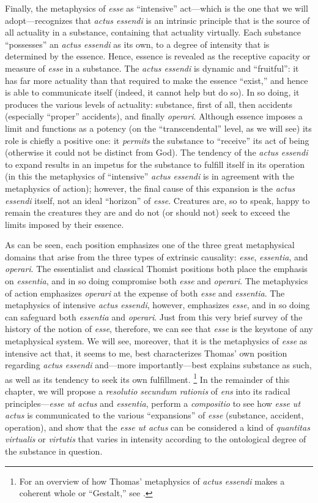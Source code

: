 Finally, the metaphysics of \emph{esse} as “intensive” act—which is the one that we will adopt—recognizes that \emph{actus essendi} is an intrinsic principle that is the source of all actuality in a substance, containing that actuality virtually. Each substance “possesses” an \emph{actus essendi} as its own, to a degree of intensity that is determined by the essence. Hence, essence is revealed as the receptive capacity or measure of \emph{esse} in a substance. The \emph{actus essendi} is dynamic and “fruitful”: it has far more actuality than that required to make the essence “exist,” and hence is able to communicate itself (indeed, it cannot help but do so). In so doing, it produces the various levels of actuality: substance, first of all, then accidents (especially “proper” accidents), and finally \emph{operari}. Although essence imposes a limit and functions as a potency (on the “transcendental” level, as we will see) its role is chiefly a positive one: it \emph{permits} the substance to “receive” its act of being (otherwise it could not be distinct from God). The tendency of the \emph{actus essendi} to expand results in an impetus for the substance to fulfill itself in its operation (in this the metaphysics of “intensive” \emph{actus essendi} is in agreement with the metaphysics of action); however, the final cause of this expansion is the \emph{actus essendi} itself, not an ideal “horizon” of \emph{esse}. Creatures are, so to speak, happy to remain the creatures they are and do not (or should not) seek to exceed the limits imposed by their essence.

As can be seen, each position emphasizes one of the three great metaphysical domains that arise from the three types of extrinsic causality: \emph{esse}, \emph{essentia}, and \emph{operari}. The essentialist and classical Thomist positions both place the emphasis on \emph{essentia}, and in so doing compromise both \emph{esse} and \emph{operari}. The metaphysics of action emphasizes \emph{operari} at the expense of both \emph{esse} and \emph{essentia}. The metaphysics of intensive \emph{actus essendi}, however, emphasizes \emph{esse}, and in so doing can safeguard both \emph{essentia} and \emph{operari}. Just from this very brief survey of the history of the notion of \emph{esse}, therefore, we can see that \emph{esse} is the keystone of any metaphysical system. We will see, moreover, that it is the metaphysics of \emph{esse} as intensive act that, it seems to me, best characterizes Thomas’ own position regarding \emph{actus essendi} and—more importantly—best explains substance as such, as well as its tendency to seek its own fulfillment.%
%
\footnote{For an overview of how Thomas’ metaphysics of \emph{actus essendi} makes a coherent whole or “Gestalt,” see \cite{villagrasa:gestalt}.}
%
In the remainder of this chapter, we will propose a \emph{resolutio secundum rationis} of \emph{ens} into its radical principles—\emph{esse ut actus} and \emph{essentia}, perform a \emph{compositio} to see how \emph{esse ut actus} is communicated to the various “expansions” of \emph{esse} (substance, accident, operation), and show that the \emph{esse ut actus} can be considered a kind of \emph{quantitas virtualis} or \emph{virtutis} that varies in intensity according to the ontological degree of the substance in question.

